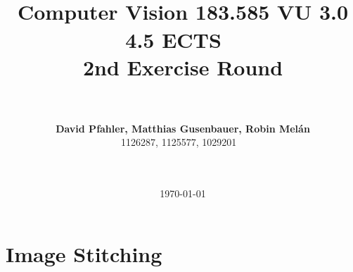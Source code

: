 \documentclass[subfigure,epsfig,fleqn,float,numbers=noenddot]{scrartcl}
\begin{document}
\date{\today}

\title{~\\
	\fontsize{12}{12pt} \bf Computer Vision 183.585 VU 3.0 4.5 ECTS
  ~\\[0.7cm]
  \fontsize{14}{14pt} \bf 2nd Exercise Round}
  

\author{~\\
  ~\\
  \fontsize{12}{12pt}
  {\bf David Pfahler, Matthias Gusenbauer, Robin Melán}\\
  1126287, 1125577, 1029201
  ~\\ ~\\ ~\\
  \normalsize
}

\maketitle
\normalfont
\thispagestyle{empty}


\section{Image Stitching}
\label{sec:1}
\end{document}
